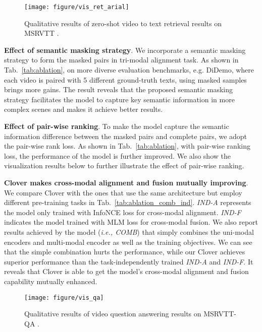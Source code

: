 \documentclass[10pt,twocolumn,letterpaper]{article}
\begin{document}
{\begin{figure}[tb]
  \centering
  \texttt{[image: figure/vis\_ret\_arial]}
 \vspace{-0.3cm}
  \caption{Qualitative results of zero-shot video to text retrieval results on MSRVTT \cite{xu2016msr}.}
   \label{fig:vis_ret}
   \vspace{-1\baselineskip}
\end{figure}


\noindent \textbf{Effect of semantic masking strategy}. We incorporate a semantic masking strategy to form the masked pairs in tri-modal alignment task.  As shown in Tab.~\ref{tab:ablation}, on more diverse evaluation benchmarks, e.g. DiDemo,  where each video is paired with 5 different ground-truth texts, using masked samples brings more gains. The result reveals that the proposed semantic masking strategy facilitates the model to capture key semantic information in more complex scenes and makes it achieve better results.


\noindent \textbf{Effect of pair-wise ranking}. To make the model capture the semantic information difference between the masked pairs and complete pairs, we adopt the pair-wise rank loss. As shown in Tab.~\ref{tab:ablation}, with pair-wise ranking loss, the performance of the model is further improved. We also show the visualization results below to further illustrate the effect of pair-wise ranking.

\noindent \textbf{Clover makes cross-modal alignment and fusion mutually improving}. We compare Clover with the ones that use the same architecture but employ different pre-training tasks in Tab.~\ref{tab:ablation_comb_ind}. \emph{IND-A} represents the model only trained with InfoNCE loss for cross-modal alignment. \emph{IND-F} indicates the model trained with MLM loss for cross-modal fusion. We also report results achieved by the model (\emph{i.e., COMB}) that simply combines the uni-modal encoders and multi-modal encoder as well as the training objectives. We can see that the simple combination   hurts the performance, while our Clover achieves superior performance than the task-independently trained \emph{IND-A} and \emph{IND-F}. It reveals that Clover is able to get the model's cross-modal alignment and fusion capability mutually enhanced. 

\begin{figure}[tb]
  \centering
  \texttt{[image: figure/vis\_qa]}
  \caption{Qualitative results of video question answering results on MSRVTT-QA \cite{xu2017video}.}
   \label{fig:vis_vqa}
   \vspace{-1\baselineskip}
\end{figure}

}
\end{document}
